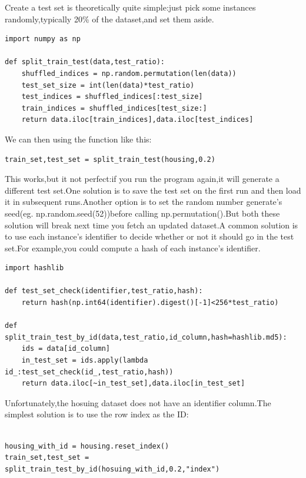 \documentclass[UTF8]{ctexart}
\begin{document}
Create a test set is theoretically quite simple:just pick some instances randomly,typically 20\% of the dataset,and set them aside.

\begin{lstlisting}
import numpy as np

def split_train_test(data,test_ratio):
	shuffled_indices = np.random.permutation(len(data))
	test_set_size = int(len(data)*test_ratio)
	test_indices = shuffled_indices[:test_size]
	train_indices = shuffled_indices[test_size:]
	return data.iloc[train_indices],data.iloc[test_indices]

\end{lstlisting}

We can then using the function like this:
\begin{lstlisting}
train_set,test_set = split_train_test(housing,0.2)
\end{lstlisting}

This works,but it not perfect:if you run the program again,it will generate a different test set.One solution is to save the test set on the first run and then load it in subsequent runs.Another option is to set the random number generate's seed(eg. np.random.seed(52))before calling np.permutation().But both these solution will break next time you fetch an updated dataset.A common solution is to use each instance's identifier to decide whether or not it should go in the test set.For example,you could compute a hash of each instance's identifier.

\begin{lstlisting}
import hashlib

def test_set_check(identifier,test_ratio,hash):
    return hash(np.int64(identifier).digest()[-1]<256*test_ratio)

def split_train_test_by_id(data,test_ratio,id_column,hash=hashlib.md5):
    ids = data[id_column]
    in_test_set = ids.apply(lambda id_:test_set_check(id_,test_ratio,hash))
    return data.iloc[~in_test_set],data.iloc[in_test_set]
\end{lstlisting}

Unfortunately,the hosuing dataset does not have an identifier column.The simplest solution is to use the row index as the ID:
\begin{lstlisting}

housing_with_id = housing.reset_index()
train_set,test_set = split_train_test_by_id(hosuing_with_id,0.2,"index")

\end{lstlisting}
\end{document}
